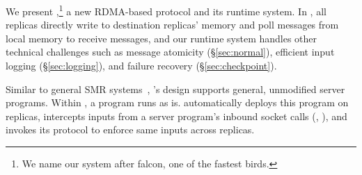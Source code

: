 We present \xxx,\footnote{We name our system after
falcon, one of the fastest birds.} a new RDMA-based \paxos protocol and its
runtime system. In \xxx, all replicas directly write to destination
replicas' memory and poll messages from local memory to receive messages, and 
our runtime system handles other technical challenges such as message 
atomicity (\S\ref{sec:normal}), efficient input logging (\S\ref{sec:logging}), 
and failure recovery (\S\ref{sec:checkpoint}).

Similar to general SMR systems~\cite{rex:eurosys14,crane:sosp15},
\xxx's design supports general, unmodified server programs. Within \xxx, a
program runs as is. \xxx automatically deploys this program on replicas, 
intercepts inputs from a server program's inbound socket calls (\eg, \recv), and 
invokes its \paxos protocol to enforce same inputs across replicas.






%



